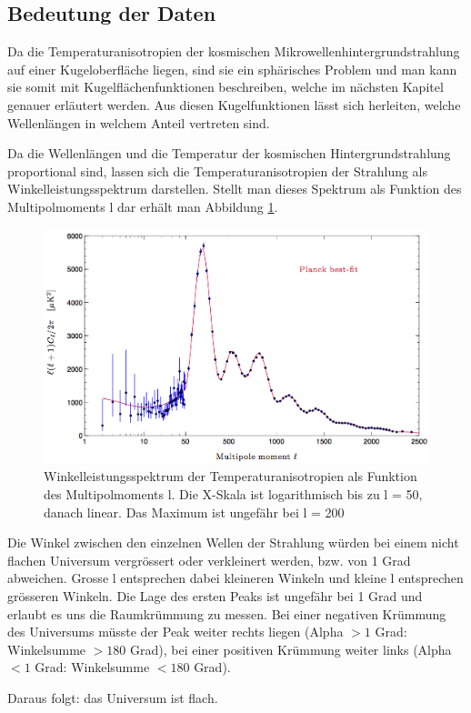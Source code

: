 \subsection{Bedeutung der Daten}
Da die Temperaturanisotropien der kosmischen Mikrowellenhintergrundstrahlung auf einer
Kugeloberfläche liegen, sind sie ein sphärisches Problem und man kann sie somit mit 
Kugelflächenfunktionen beschreiben, welche im nächsten Kapitel genauer erläutert werden.
Aus diesen Kugelfunktionen lässt sich herleiten, welche Wellenlängen in welchem Anteil vertreten sind.

Da die Wellenlängen und die Temperatur der kosmischen Hintergrundstrahlung proportional sind, lassen sich die Temperaturanisotropien der Strahlung als Winkelleistungsspektrum darstellen.
Stellt man dieses Spektrum als Funktion des Multipolmoments l dar erhält man Abbildung \ref{fig:planck_spectrum}.

\begin{figure}
	\includegraphics[width=\linewidth]{cmb/images/mission_spectrum.png}
	\caption{Winkelleistungsspektrum der Temperaturanisotropien als Funktion des Multipolmoments l.
		Die X-Skala ist logarithmisch bis zu l = 50, danach linear. Das Maximum ist ungefähr bei l = 200}
	\label{fig:planck_spectrum}
\end{figure}

Die Winkel zwischen den einzelnen Wellen der Strahlung würden bei einem nicht flachen Universum
vergrössert oder verkleinert werden, bzw. von 1 Grad abweichen. %
Grosse l entsprechen dabei kleineren Winkeln und kleine l entsprechen grösseren Winkeln.
Die Lage des ersten Peaks ist ungefähr bei 1 Grad und erlaubt es uns die Raumkrümmung zu messen.
Bei einer negativen Krümmung des Universums müsste der Peak weiter rechts liegen (Alpha $> 1$ Grad: Winkelsumme $> 180$ Grad),
bei einer positiven Krümmung weiter links (Alpha $< 1$ Grad: Winkelsumme $< 180$  Grad).

Daraus folgt: das Universum ist flach.
